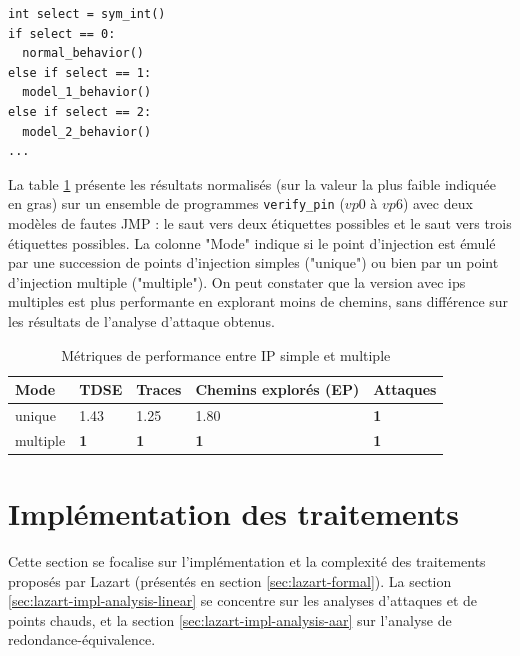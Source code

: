                 \begin{minipage}{0.93\linewidth}
\begin{lstlisting}    
int select = sym_int()
if select == 0:
  normal_behavior()
else if select == 1:
  model_1_behavior()
else if select == 2:
  model_2_behavior()
...                \end{lstlisting}    
                \end{minipage}         

                La table \ref{tbl:multi-ip} présente les résultats normalisés (sur la valeur la plus faible indiquée en gras) sur un ensemble de programmes \texttt{verify\_pin} ($vp0$ à $vp6$) avec deux modèles de fautes \gls{JMP} : le saut vers deux étiquettes possibles et le saut vers trois étiquettes possibles.
                La colonne "Mode" indique si le point d'injection est émulé par une succession de points d'injection simples ("unique") ou bien par un point d'injection multiple ("multiple"). 
                On peut constater que la version avec \gls{ip}s multiples est plus performante en explorant moins de chemins, sans différence sur les résultats de l'analyse d'attaque obtenus.
                
            \begin{table}[h]
            \centering
\begin{tabular}{l||l|l|l|l}
Mode & TDSE & Traces & Chemins explorés (EP) & Attaques \\
\hline
\hline
unique & 1.43 & 1.25 & 1.80 & \textbf{1} \\
\hline
multiple & \textbf{1} & \textbf{1} & \textbf{1} & \textbf{1}
\end{tabular}
            \caption{Métriques de performance entre IP simple et multiple}
            \label{tbl:multi-ip}
\end{table}
        
 	\section{Implémentation des traitements}
 	\label{sec:lazart-impl-analysis}
 	
 	    Cette section se focalise sur l'implémentation et la complexité des traitements proposés par Lazart (présentés en section \ref{sec:lazart-formal}).
 	    La section \ref{sec:lazart-impl-analysis-linear} se concentre sur les analyses d'attaques et de points chauds, et 
 	    la section \ref{sec:lazart-impl-analysis-aar} sur l'analyse de redondance-équivalence.
 	
